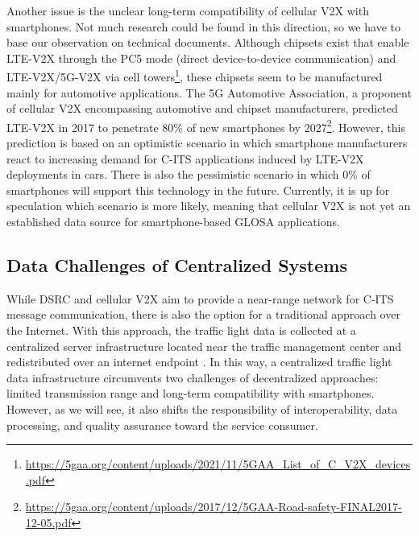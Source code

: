 Another issue is the unclear long-term compatibility of cellular V2X with smartphones. Not much research could be found in this direction, so we have to base our observation on technical documents. Although chipsets exist that enable LTE-V2X through the PC5 mode (direct device-to-device communication) and LTE-V2X/5G-V2X via cell towers\footnote{\url{https://5gaa.org/content/uploads/2021/11/5GAA_List_of_C_V2X_devices.pdf}}, these chipsets seem to be manufactured mainly for automotive applications. The 5G Automotive Association, a proponent of cellular V2X encompassing automotive and chipset manufacturers, predicted LTE-V2X in 2017 to penetrate 80\% of new smartphones by 2027\footnote{\url{https://5gaa.org/content/uploads/2017/12/5GAA-Road-safety-FINAL2017-12-05.pdf}}. However, this prediction is based on an optimistic scenario in which smartphone manufacturers react to increasing demand for C-ITS applications induced by LTE-V2X deployments in cars. There is also the pessimistic scenario in which 0\% of smartphones will support this technology in the future. Currently, it is up for speculation which scenario is more likely, meaning that cellular V2X is not yet an established data source for smartphone-based GLOSA applications.

\subsection{Data Challenges of Centralized Systems}

While DSRC and cellular V2X aim to provide a near-range network for C-ITS message communication, there is also the option for a traditional approach over the Internet. With this approach, the traffic light data is collected at a centralized server infrastructure located near the traffic management center and redistributed over an internet endpoint \cite{zweck_traffic_2013, protschky_extensive_2014, protschky_adaptive_2014}. In this way, a centralized traffic light data infrastructure circumvents two challenges of decentralized approaches: limited transmission range and long-term compatibility with smartphones. However, as we will see, it also shifts the responsibility of interoperability, data processing, and quality assurance toward the service consumer.

